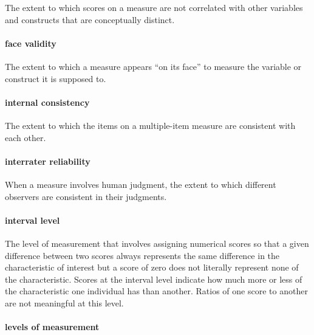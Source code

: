 \documentclass[
]{krantz}
\begin{document}
The extent to which scores on a measure are not correlated with other variables and constructs that are conceptually distinct.

\hypertarget{face-validity-1}{%
\paragraph*{face validity}\label{face-validity-1}}

The extent to which a measure appears ``on its face'' to measure the variable or construct it is supposed to.

\hypertarget{internal-consistency-1}{%
\paragraph*{internal consistency}\label{internal-consistency-1}}

The extent to which the items on a multiple-item measure are consistent with each other.

\hypertarget{interrater-reliability-1}{%
\paragraph*{interrater reliability}\label{interrater-reliability-1}}

When a measure involves human judgment, the extent to which different observers are consistent in their judgments.

\hypertarget{interval-level}{%
\paragraph*{interval level}\label{interval-level}}

The level of measurement that involves assigning numerical scores so that a given difference between two scores always represents the same difference in the characteristic of interest but a score of zero does not literally represent none of the characteristic. Scores at the interval level indicate how much more or less of the characteristic one individual has than another. Ratios of one score to another are not meaningful at this level.

\hypertarget{levels-of-measurement-1}{%
\paragraph*{levels of measurement}\label{levels-of-measurement-1}}
\end{document}
